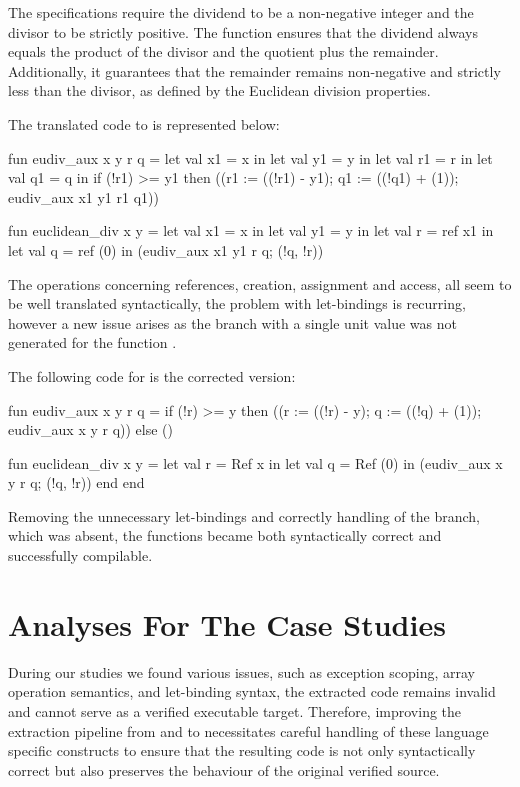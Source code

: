 The \gospel specifications require the dividend to be a non-negative integer and the divisor to be strictly positive. The function 
ensures that the dividend always equals the product of the divisor and the quotient plus the remainder. Additionally, it guarantees 
that the remainder remains non-negative and strictly less than the divisor, as defined by the Euclidean division properties.

The translated code to \cml is represented below:

\begin{cakeml}
fun eudiv_aux x y r q = let val x1 = x in
  let val y1 = y in
  let val r1 = r in
  let val q1 = q in
  if (!r1) >= y1
  then ((r1 := ((!r1) - y1); q1 := ((!q1) + (1)); eudiv_aux x1 y1 r1 q1))

fun euclidean_div x y =
  let val x1 = x in
  let val y1 = y in
  let val r = ref x1 in
  let val q = ref (0) in (eudiv_aux x1 y1 r q; (!q, !r))
\end{cakeml}

The operations concerning references, creation, assignment and access, all seem to be well translated syntactically, the problem with
let-bindings is recurring, however a new issue arises as the  branch with a single unit value was not generated for the 
function .

The following code for \cml is the corrected version:

\begin{cakeml}
fun eudiv_aux x y r q =
  if (!r) >= y
  then ((r := ((!r) - y); q := ((!q) + (1)); eudiv_aux x y r q))
  else ()

fun euclidean_div x y =
  let val r = Ref x in
  let val q = Ref (0) in (eudiv_aux x y r q; (!q, !r)) 
    end end
\end{cakeml}

Removing the unnecessary let-bindings and correctly handling of the  branch, which was absent, the functions became 
both syntactically correct and successfully compilable.

\section{Analyses For The Case Studies}

During our studies we found various issues, such as exception scoping, array operation semantics, and let-binding syntax, the extracted 
code remains invalid and cannot serve as a verified executable target. Therefore, improving the extraction pipeline from \ocaml and 
\gospel to \cml necessitates careful handling of these language specific constructs to ensure that the resulting code is not only 
syntactically correct but also preserves the behaviour of the original verified source.
